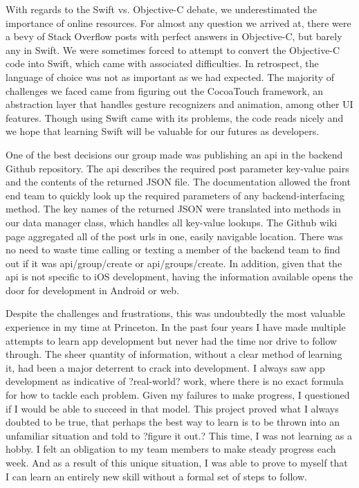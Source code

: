 \documentclass[12pt]{article}
\begin{document}
\bigskip

With regards to the Swift vs. Objective-C debate, we underestimated the importance of online resources. For almost any question we arrived at, there were a bevy of Stack Overflow posts with perfect answers in Objective-C, but barely any in Swift. We were sometimes forced to attempt to convert the Objective-C code into Swift, which came with associated difficulties. In retrospect, the language of choice was not as important as we had expected. The majority of challenges we faced came from figuring out the CocoaTouch framework, an abstraction layer that handles gesture recognizers and animation, among other UI features. Though using Swift came with its problems, the code reads nicely and we hope that learning Swift will be valuable for our futures as developers.

\bigskip

One of the best decisions our group made was publishing an api in the backend Github repository. The api describes the required post parameter key-value pairs and the contents of the returned JSON file. The documentation allowed the front end team to quickly look up the required parameters of any backend-interfacing method. The key names of the returned JSON were translated into methods in our data manager class, which handles all key-value lookups. The Github wiki page aggregated all of the post urls in one, easily navigable location. There was no need to waste time calling or texting a member of the backend team to find out if it was api/group/create or api/groups/create. In addition, given that the api is not specific to iOS development, having the information available opens the door for development in Android or web.

\bigskip

Despite the challenges and frustrations, this was undoubtedly the most valuable experience in my time at Princeton. In the past four years I have made multiple attempts to learn app development but never had the time nor drive to follow through. The sheer quantity of information, without a clear method of learning it, had been a major deterrent to crack into development. I always saw app development as indicative of ?real-world? work, where there is no exact formula for how to tackle each problem. Given my failures to make progress, I questioned if I would be able to succeed in that model. This project proved what I always doubted to be true, that perhaps the best way to learn is to be thrown into an unfamiliar situation and told to ?figure it out.? This time, I was not learning as a hobby. I felt an obligation to my team members to make steady progress each week. And as a result of this unique situation, I was able to prove to myself that I can learn an entirely new skill without a formal set of steps to follow. 
\end{document}

